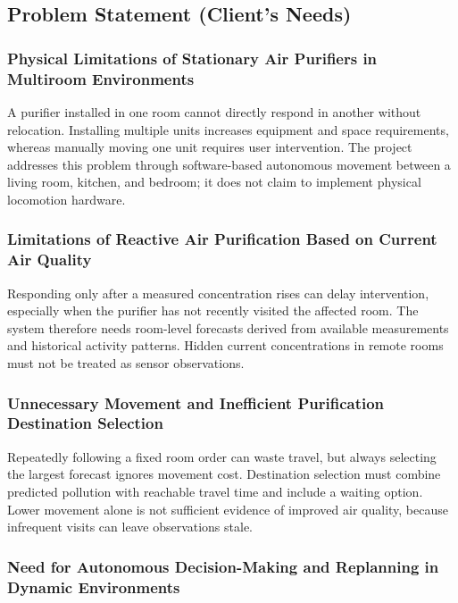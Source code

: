 \documentclass[conference]{IEEEtran}
\begin{document}
\subsection{Problem Statement (Client's Needs)}

\subsubsection{Physical Limitations of Stationary Air Purifiers in Multiroom Environments}

A purifier installed in one room cannot directly respond in another without relocation. Installing multiple units increases equipment and space requirements, whereas manually moving one unit requires user intervention. The project addresses this problem through software-based autonomous movement between a living room, kitchen, and bedroom; it does not claim to implement physical locomotion hardware.

\subsubsection{Limitations of Reactive Air Purification Based on Current Air Quality}

Responding only after a measured concentration rises can delay intervention, especially when the purifier has not recently visited the affected room. The system therefore needs room-level forecasts derived from available measurements and historical activity patterns. Hidden current concentrations in remote rooms must not be treated as sensor observations.

\subsubsection{Unnecessary Movement and Inefficient Purification Destination Selection}

Repeatedly following a fixed room order can waste travel, but always selecting the largest forecast ignores movement cost. Destination selection must combine predicted pollution with reachable travel time and include a waiting option. Lower movement alone is not sufficient evidence of improved air quality, because infrequent visits can leave observations stale.

\subsubsection{Need for Autonomous Decision-Making and Replanning in Dynamic Environments}
\end{document}
